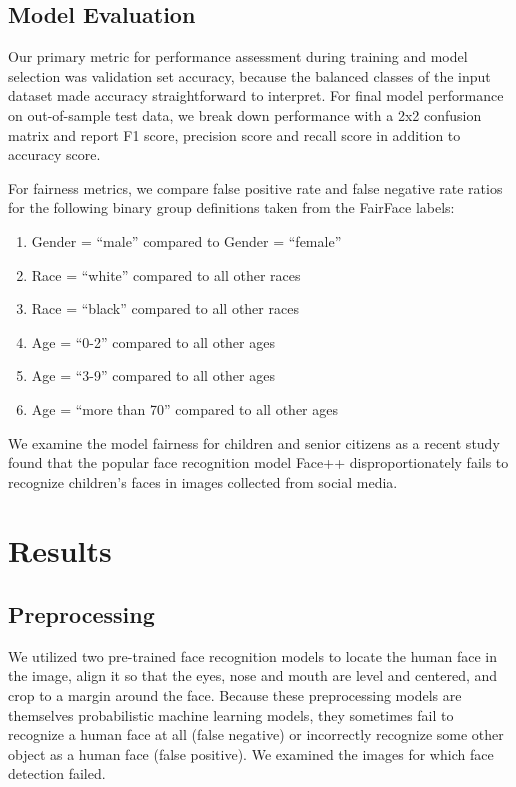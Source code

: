 \documentclass[11pt, letterpaper]{article}
\begin{document}
\begin{multicols}{2}
  \subsection{Model Evaluation}

  Our primary metric for performance assessment during training and model
  selection was validation set accuracy, because the balanced classes of the
  input dataset made accuracy straightforward to interpret. For final model
  performance on out-of-sample test data, we break down performance with a 2x2
  confusion matrix and report F1 score, precision score and recall score in
  addition to accuracy score.

  For fairness metrics, we compare false positive rate and false negative rate
  ratios for the following binary group definitions taken from the FairFace
  labels:

  \begin{enumerate}
  \item Gender = ``male'' compared to Gender = ``female''
  \item Race = ``white'' compared to all other races
  \item Race = ``black'' compared to all other races
  \item Age = ``0-2'' compared to all other ages
  \item Age = ``3-9'' compared to all other ages
  \item Age = ``more than 70'' compared to all other ages
  \end{enumerate}

  We examine the model fairness for children and senior citizens as a recent
  study \cite{9156262} found that the popular face recognition model Face++
  disproportionately fails to recognize children's faces in images collected
  from social media.

  \section{Results}

  \subsection{Preprocessing}

  We utilized two pre-trained face recognition models to locate the human face
  in the image, align it so that the eyes, nose and mouth are level and
  centered, and crop to a margin around the face. Because these preprocessing
  models are themselves probabilistic machine learning models, they sometimes
  fail to recognize a human face at all (false negative) or incorrectly
  recognize some other object as a human face (false positive). We examined the
  images for which face detection failed.


\end{multicols}
\end{document}
